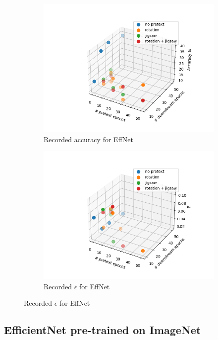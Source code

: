\begin{figure}
    \begin{subfigure}{\textwidth}
        \caption{Recorded accuracy for EffNet}
        \includegraphics[width=15cm]{images/efficientnetb0_acc}
    \end{subfigure}
    \begin{subfigure}{\textwidth}
        \caption{Recorded $\overline{\epsilon}$ for EffNet}
        \includegraphics[width=15cm]{images/efficientnetb0_eps}
    \end{subfigure}
\end{figure}


\newpage

\subsection{EfficientNet pre-trained on ImageNet}

